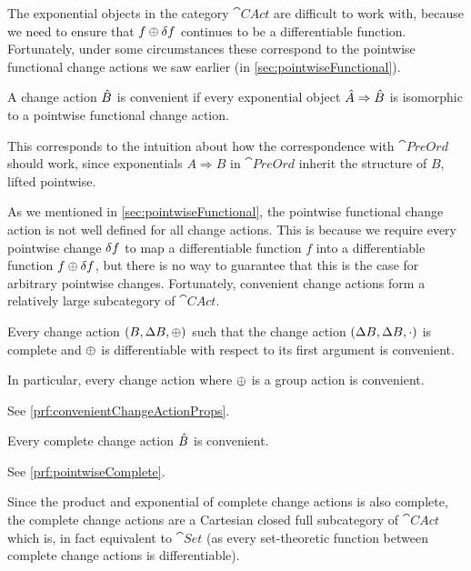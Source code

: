 The exponential objects in the category $\cat{CAct}$ are difficult to work with,
because we need to ensure that $f \oplus \delta f$ continues to be a
differentiable function. Fortunately, under some circumstances these correspond
to the pointwise functional change actions we saw earlier (in \cref{sec:pointwiseFunctional}).

\begin{defn}
  \label{def:convenientChangeActions}
  A change action $\hat{B}$ is convenient if every exponential object
  ${\hat{A}} \Rightarrow {\hat{B}}$ is isomorphic to a pointwise functional change action.
\end{defn}

This corresponds to the intuition about how the correspondence with
$\cat{PreOrd}$ should work, since exponentials $A \Rightarrow B$ in $\cat{PreOrd}$ inherit the
structure of $B$, lifted pointwise.

As we mentioned in \cref{sec:pointwiseFunctional}, 
the pointwise functional change action is not well defined for all change actions.
This is because we require every pointwise change $\delta f$ to map a differentiable
function $f$ into a differentiable function $f \oplus \delta f$, but there is no way
to guarantee that this is the case for arbitrary pointwise changes.
Fortunately, convenient change actions form a relatively large subcategory of $\cat{CAct}$.

\begin{prop}[name=Convenient change actions, restate=convenientChangeActionProps]
  \label{prop:convenientChangeActionProps}
  Every change action $(B,\Delta B,\oplus)$ such that the change action
  $(\Delta B,\Delta B,\cdot)$ is complete and $\oplus$ is differentiable with
  respect to its first argument is convenient.

  In particular, every change action where $\oplus$ is a group action is convenient.
\end{prop}
\ifproofs
  See \cref{prf:convenientChangeActionProps}.
\fi

\begin{prop}[name=Complete change actions are convenient, restate=pointwiseComplete]
  \label{prop:pointwiseComplete}
   Every complete change action $\hat{B}$ is convenient.
\end{prop}
\ifproofs
  See \cref{prf:pointwiseComplete}.
\fi

Since the product and exponential of complete change actions is also complete,  the complete change
actions are a Cartesian closed full subcategory of $\cat{CAct}$ which is, in fact equivalent
to $\cat{Set}$ (as every set-theoretic function between complete change actions is differentiable).

